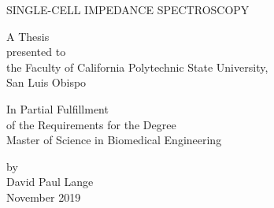 \begin{titlepage}
\begin{center}
\vspace*{1cm}

\large SINGLE-CELL IMPEDANCE SPECTROSCOPY

\vfill

A Thesis\\
presented to\\
the Faculty of California Polytechnic State University,\\
San Luis Obispo\\

\vfill

In Partial Fulfillment\\
of the Requirements for the Degree\\
Master of Science in Biomedical Engineering\\

\vspace{0.75 in}

by\\
David Paul Lange\\
November 2019
\vspace{1.5 in}
    
    
\end{center}
\end{titlepage}